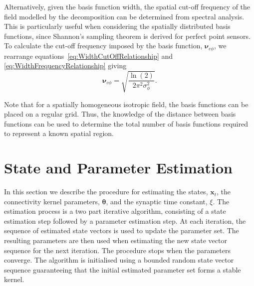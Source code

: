 \documentclass[10pt,a4paper]{article}
\begin{document}
Alternatively, given the basis function width, the spatial cut-off frequency of the field modelled by the decomposition can be determined from spectral analysis. This is particularly useful when considering the spatially distributed basis functions, since Shannon's sampling theorem is derived for perfect point sensors. To calculate the cut-off frequency imposed by the basis function, $\boldsymbol{\nu}_{c\phi}$, we rearrange equations~\ref{eq:WidthCutOffRelationship} and \ref{eq:WidthFrequencyRelationship} giving
\begin{equation}\label{eq:CutoffFromBasisFuncWidth}
	\boldsymbol{\nu}_{c\phi}=\sqrt{\frac{\ln(2)}{2\pi^2\sigma_{\phi}^2}}.
\end{equation} 

Note that for a spatially homogeneous isotropic field, the basis functions can be placed on a regular grid. Thus, the knowledge of the distance between basis functions can be used to determine the total number of basis functions required to represent a known spatial region.

% 
\section{State and Parameter Estimation}\label{StateAndParameterEstimationSection} In this section we describe the procedure for estimating the states, $\mathbf{x}_t$, the connectivity kernel parameters, $\boldsymbol \theta$, and the synaptic time constant, $\xi$. The estimation process is a two part iterative algorithm, consisting of a state estimation step followed by a parameter estimation step. At each iteration, the sequence of estimated state vectors is used to update the parameter set. The resulting parameters are then used when estimating the new state vector sequence for the next iteration. The procedure stops when the parameters converge. The algorithm is initialised using a bounded random state vector sequence guaranteeing that the initial estimated parameter set forms a stable kernel.
\end{document}

